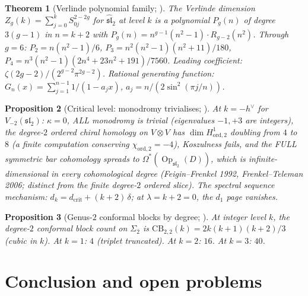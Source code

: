 \documentclass[11pt,reqno]{amsart}
\newtheorem{theorem}{Theorem}[section]
\newtheorem{proposition}[theorem]{Proposition}
\theoremstyle{definition}
\theoremstyle{remark}
\numberwithin{equation}{section}
\begin{document}
\begin{theorem}[Verlinde polynomial family; {\cite[Thm.~\ref*{thm:verlinde-polynomial-family}]{Lorgat26I}}]
\label{thm:verlinde-poly-standalone}
The Verlinde dimension $Z_g(k) = \sum_{j=0}^k S_{0j}^{2-2g}$
for $\widehat{\mathfrak{sl}}_2$ at level $k$ is a polynomial
$P_g(n)$ of degree $3(g-1)$ in $n = k + 2$ with
$P_g(n) = n^{g-1}(n^2 - 1) \cdot R_{g-2}(n^2)$.
Through $g = 6$: $P_2 = n(n^2{-}1)/6$,
$P_3 = n^2(n^2{-}1)(n^2{+}11)/180$,
$P_4 = n^3(n^2{-}1)(2n^4{+}23n^2{+}191)/7560$.
Leading coefficient: $\zeta(2g{-}2)/(2^{g-2}\pi^{2g-2})$.
Rational generating function:
$G_n(x) = \sum_{j=1}^{n-1} 1/(1 - a_j x)$,
$a_j = n/(2\sin^2(\pi j/n))$.
\end{theorem}

\begin{proposition}[Critical level: monodromy trivialises; {\cite[Prop.~\ref*{prop:critical-level-ordered}]{Lorgat26I}}]
\label{prop:critical-standalone}
At $k = -h^\vee$ for $V_{-2}(\mathfrak{sl}_2)$:
$\kappa = 0$, ALL monodromy is trivial
\textup{(}eigenvalues $-1, +3$ are integers\textup{)},
the degree-$2$ ordered chiral homology on $V \otimes V$
has $\dim H^1_{\mathrm{ord}, 2}$ doubling from $4$ to $8$
\textup{(}a finite computation conserving $\chi_{\mathrm{ord}, 2} = -4$\textup{)},
Koszulness fails, and the FULL symmetric bar cohomology spreads
to $\Omega^*(\operatorname{Op}_{\mathfrak{sl}_2}(D))$, which is
infinite-dimensional in every cohomological degree
\textup{(}Feigin--Frenkel 1992, Frenkel--Teleman 2006; distinct from the finite
degree-$2$ ordered slice\textup{)}.
The spectral sequence mechanism:
$d_k = d_{\mathrm{crit}} + (k+2)\,\delta$; at
$\lambda = k + 2 = 0$, the $d_1$ page vanishes.
\end{proposition}

\begin{proposition}[Genus-$2$ conformal blocks by degree; {\cite[Prop.~\ref*{prop:g2-conformal-block-degree}]{Lorgat26I}}]
\label{prop:g2-cb-standalone}
At integer level $k$, the degree-$2$ conformal block count
on $\Sigma_2$ is
$\mathrm{CB}_{2,2}(k) = 2k(k+1)(k+2)/3$
\textup{(}cubic in $k$\textup{)}. At $k = 1$: $4$
\textup{(}triplet truncated\textup{)}.
At $k = 2$: $16$. At $k = 3$: $40$.
\end{proposition}


\section{Conclusion and open problems}
\label{sec:conclusion}
\end{document}
